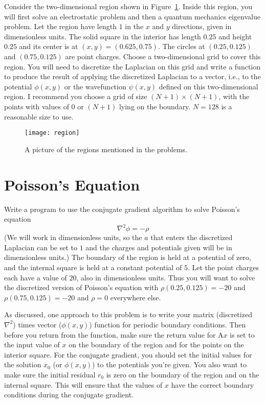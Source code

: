 Consider the two-dimensional region shown in Figure~\ref{fig:region}.
Inside this region, you will first
solve an electrostatic problem and then a quantum mechanics eigenvalue problem. Let the
region have length \(1\) in the \(x\) and \(y\) directions, given in dimensionless units.
The solid square in the interior has length \(0.25\) and height \(0.25\) and its center is
at \((x, y) = (0.625, 0.75)\). The circles at \((0.25, 0.125)\) and \((0.75, 0.125)\) are
point charges. Choose a two-dimensional grid to cover this region. You will need to
discretize the Laplacian on this grid and write a function to produce the result of applying
the discretized Laplacian to a vector, i.e., to the potential \(\phi(x, y)\) or the
wavefunction \(\psi(x, y)\) defined on this two-dimensional region. I recommend you choose a
grid of size \((N + 1) \times (N + 1)\), with the points with values of \(0\) or \((N + 1)\)
lying on the boundary. \(N = 128\) is a reasonable size to use.

\begin{figure}[hb]
    \centering
    \texttt{[image: region]}
    \caption{A picture of the regions mentioned in the problems.}
    \label{fig:region}
\end{figure}

\section{Poisson's Equation}\label{sec:pe}

Write a program to use the conjugate gradient algorithm to solve Poisson's equation
%
\begin{equation}
    \nabla^2 \phi = -\rho
\end{equation}
%
(We will work in dimensionless units, so the \(a\) that enters the discretized Laplacian can be
set to \(1\) and the charges and potentials given will be in dimensionless units.) The
boundary of the region is held at a potential of zero, and the internal square is held at a
constant potential of \(5\). Let the point charges each have a value of \(20\), also in
dimensionless units. Thus you will want to solve the discretized version of Poisson's
equation with \(\rho(0.25, 0.125) = -20\) and \(\rho(0.75, 0.125) = -20\) and \(\rho = 0\)
everywhere else.

As discussed, one approach to this problem is to write your matrix
(discretized \(\nabla^2\)) times vector (\(\phi(x, y)\)) function for periodic boundary
conditions. Then before you return from the function, make sure the return value for
\(\mathrm{ A } x\) is set to the input value of \(x\) on the boundary of the region and for
the points on the interior square. For the conjugate gradient, you should set the initial
values for the solution \(x_0\) (or \(\phi(x, y)\)) to the potentials you're given. You also
want to make sure the initial residual \(r_0\) is zero on the boundary of the region and on
the internal square. This will ensure that the values of \(x\) have the correct boundary
conditions during the conjugate gradient.

